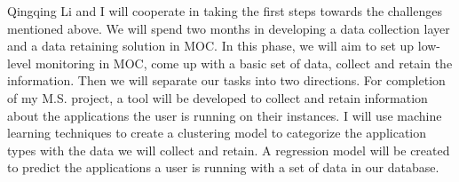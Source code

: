 Qingqing Li and I will cooperate in taking the first steps towards the challenges mentioned above. We will spend two months in developing a data collection layer and a data retaining solution in MOC. In this phase, we will aim to set up low-level monitoring in MOC, come up with a basic set of data, collect and retain the information. Then we will separate our tasks into two directions. For completion of my M.S. project, a tool will be developed to collect and retain information about the applications the user is running on their instances.  I will use machine learning techniques to create a clustering model to categorize the application types with the data we will collect and retain. A regression model will be created to predict the applications a user is running with a set of data in our database.
